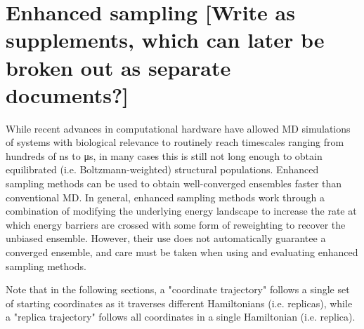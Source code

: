 \section{Enhanced sampling [Write as supplements, which can later be broken out as separate documents?]}
\label{sec:enhanced}

While recent advances in computational hardware have allowed MD simulations of systems with biological relevance to routinely reach timescales ranging from hundreds of \si{\nano\second} to \si{\micro\second}, in many cases this is still not long enough to obtain equilibrated (i.e. Boltzmann-weighted) structural populations. Enhanced sampling methods can be used to obtain well-converged ensembles faster than conventional MD. In general, enhanced sampling methods work through a combination of modifying the underlying energy landscape to increase the rate at which energy barriers are crossed with some form of reweighting to recover the unbiased ensemble. However, their use does not automatically guarantee a converged ensemble, and care must be taken when using and evaluating enhanced sampling methods.

Note that in the following sections, a "coordinate trajectory" follows a single set of starting coordinates as it traverses different Hamiltonians (i.e. replicas), while a "replica trajectory" follows all coordinates in a single Hamiltonian (i.e. replica).

